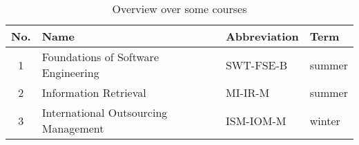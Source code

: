 
\begin{table}[h]
	\centering
	\begin{tabular}{clll}
	\toprule
	No. & Name & Abbreviation & Term \\
	\midrule
	1 & Foundations of Software Engineering & SWT-FSE-B & summer \\
	2 & Information Retrieval & MI-IR-M & summer \\
	3 & International Outsourcing Management & ISM-IOM-M & winter \\			
	\bottomrule
	\end{tabular}
	\caption{Overview over some courses}
\end{table}
